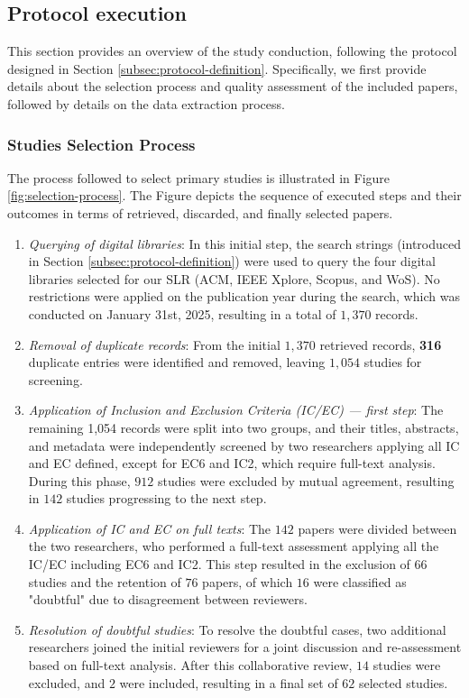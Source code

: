 \subsection{Protocol execution}
\label{subsec:protocol-execution}
This section provides an overview of the study conduction, following the protocol designed in Section \ref{subsec:protocol-definition}. Specifically, we first provide details about
the selection process and quality assessment of the included papers, followed by details on the data extraction process.


\subsubsection{Studies Selection Process} 
The process followed to select primary studies is illustrated in Figure \ref{fig:selection-process}. The Figure depicts the sequence of executed steps and their outcomes in terms of retrieved, discarded, and finally selected papers. 

\begin{enumerate}
\item \textit{Querying of digital libraries}: In this initial step, the search strings (introduced in Section \ref{subsec:protocol-definition}) were used to query the four digital libraries selected for our SLR (ACM, IEEE Xplore, Scopus, and WoS). No restrictions were applied on the publication year during the search, which was conducted on January 31st, 2025, resulting in a total of $1,370$ records.

\item \textit{Removal of duplicate records}: From the initial $1,370$ retrieved records, \textbf{316} duplicate entries were identified and removed, leaving $1,054$ studies for  screening.

\item \textit{Application of Inclusion and Exclusion Criteria (IC/EC) — first step}: The remaining 1,054 records were split into two groups, and their titles, abstracts, and metadata were independently screened by two researchers applying all IC and EC defined, except for EC6 and IC2, which require full-text analysis. During this phase, $912$ studies were excluded by mutual agreement, resulting in $142$ studies progressing to the next step.

\item \textit{Application of IC and EC on full texts}: The $142$ papers were divided between the two researchers, who performed a full-text assessment applying all the IC/EC including EC6 and IC2. This step resulted in the exclusion of $66$ studies and the retention of $76$ papers, of which $16$ were classified as "doubtful" due to disagreement between reviewers.

\item \textit{Resolution of doubtful studies}: To resolve the doubtful cases, two additional researchers joined the initial reviewers for a joint discussion and re-assessment based on full-text analysis. After this collaborative review, $14$ studies were excluded, and $2$ were included, resulting in a final set of $62$ selected studies.
\end{enumerate}

